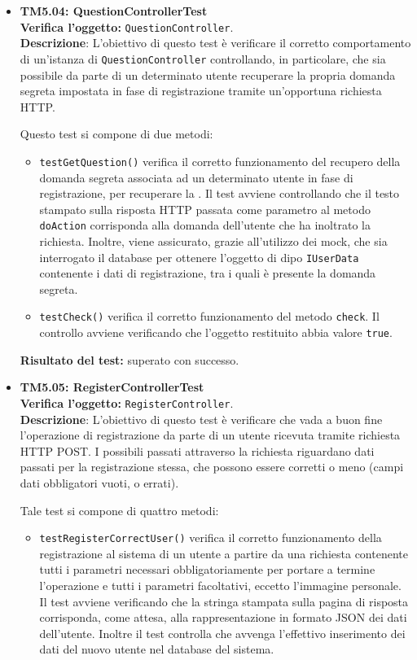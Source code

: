 \begin{itemize}
\item \textbf{TM5.04: QuestionControllerTest}\\
\textbf{Verifica l'oggetto:} \texttt{QuestionController}.\\
\textbf{Descrizione}: L'obiettivo di questo test è verificare il corretto comportamento di un'istanza di \texttt{QuestionController} controllando, in particolare, che sia possibile da parte di un determinato utente recuperare la propria domanda segreta impostata in fase di registrazione tramite un'opportuna richiesta HTTP\@.

Questo test si compone di due metodi:
\begin{itemize}

\item \texttt{testGetQuestion()} verifica il corretto funzionamento del recupero della domanda segreta associata ad un determinato utente in fase di registrazione, per recuperare la .
Il test avviene controllando che il testo stampato sulla risposta HTTP passata come parametro al metodo \texttt{doAction} corrisponda alla domanda dell'utente che ha inoltrato la richiesta. Inoltre, viene assicurato, grazie all'utilizzo dei mock, che sia interrogato il database per ottenere l'oggetto di dipo \texttt{IUserData} contenente i dati di registrazione, tra i quali è presente la domanda segreta. 

\item \texttt{testCheck()} verifica il corretto funzionamento del metodo \texttt{check}. Il controllo avviene verificando che l'oggetto restituito abbia valore \texttt{true}.
 
\end{itemize}

\textbf{Risultato del test:} superato con successo.

\item \textbf{TM5.05: RegisterControllerTest}\\
\textbf{Verifica l'oggetto:} \texttt{RegisterController}.\\
\textbf{Descrizione}: L'obiettivo di questo test è verificare che vada a buon fine l'operazione di registrazione da parte di un utente ricevuta tramite richiesta HTTP POST\@. I possibili  passati attraverso la richiesta riguardano dati passati per la registrazione stessa, che possono essere corretti o meno (campi dati obbligatori vuoti, o errati).

Tale test si compone di quattro metodi:
\begin{itemize}
\item \texttt{testRegisterCorrectUser()} verifica il corretto funzionamento della registrazione al sistema di un utente a partire da una richiesta contenente tutti i parametri necessari obbligatoriamente per portare a termine l'operazione e tutti i parametri facoltativi, eccetto l'immagine personale. Il test avviene verificando che la stringa stampata sulla pagina di risposta corrisponda, come attesa, alla rappresentazione in formato JSON dei dati dell'utente. Inoltre il test controlla che avvenga l'effettivo inserimento dei dati del nuovo utente nel database del sistema.


\end{itemize}
\end{itemize}
